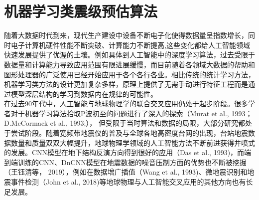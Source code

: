
\chapter{机器学习类震级预估算法}
\indent 随着大数据时代到来，现代生产建设中设备不断电子化使得数据量呈指数增长，同时电子计算机硬件性能不断突破、计算能力不断提高,这些变化都给人工智能领域快速发展提供了优渥的土壤。例如具体到人工智能中的深度学习算法，过去受限于数据量和计算能力导致应用范围有限进展缓慢，而目前随着各领域大数据的帮助和图形处理器的广泛使用已经开始应用于各个各行各业。相比传统的统计学习方法，机器学习类方法的设计更加复杂多样，原理上提供了无需手动进行特征工程而是通过模型深层结构的学习到数据内在规律的可能性。\\
\indent 在过去90年代中，人工智能与地球物理学的联合交叉应用仍处于起步阶段。很多学者对于机器学习算法拾取P波初至的问题进行了深入的探索（Murat et al., 1993；D.McCormack et al., 1993;）， 但受限于当时算法和数据的局限，大部分研究都处于尝试阶段。随着宽频带地震仪的普及与全球各地高密度台网的出现，台站地震数据数量和质量双双大幅提升，地球物理学领域的人工智能方法不断前进获得井喷式的发展。CNN模型在地下结构反演方向得到很好的应用（Das et al., 1993)，而端到端训练的CNN、DnCNN模型在地震数据的噪音压制方面的优势也不断被挖掘（王钰清等， 2019），例如在数据增广插值（Wang et al., 1993)、微地震识别和地震事件检测（John et al., 2018)等地球物理与人工智能交叉应用的其他方向也有长足发展。\\
